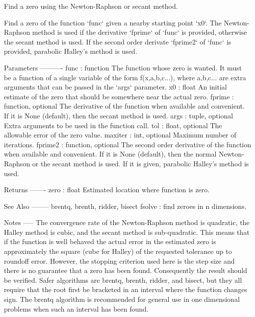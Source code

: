 \begin{DoxyVerb}Find a zero using the Newton-Raphson or secant method.

Find a zero of the function `func` given a nearby starting point `x0`.
The Newton-Raphson method is used if the derivative `fprime` of `func`
is provided, otherwise the secant method is used.  If the second order
derivate `fprime2` of `func` is provided, parabolic Halley's method
is used.

Parameters
----------
func : function
    The function whose zero is wanted. It must be a function of a
    single variable of the form f(x,a,b,c...), where a,b,c... are extra
    arguments that can be passed in the `args` parameter.
x0 : float
    An initial estimate of the zero that should be somewhere near the
    actual zero.
fprime : function, optional
    The derivative of the function when available and convenient. If it
    is None (default), then the secant method is used.
args : tuple, optional
    Extra arguments to be used in the function call.
tol : float, optional
    The allowable error of the zero value.
maxiter : int, optional
    Maximum number of iterations.
fprime2 : function, optional
    The second order derivative of the function when available and
    convenient. If it is None (default), then the normal Newton-Raphson
    or the secant method is used. If it is given, parabolic Halley's
    method is used.

Returns
-------
zero : float
    Estimated location where function is zero.

See Also
--------
brentq, brenth, ridder, bisect
fsolve : find zeroes in n dimensions.

Notes
-----
The convergence rate of the Newton-Raphson method is quadratic,
the Halley method is cubic, and the secant method is
sub-quadratic.  This means that if the function is well behaved
the actual error in the estimated zero is approximately the square
(cube for Halley) of the requested tolerance up to roundoff
error. However, the stopping criterion used here is the step size
and there is no guarantee that a zero has been found. Consequently
the result should be verified. Safer algorithms are brentq,
brenth, ridder, and bisect, but they all require that the root
first be bracketed in an interval where the function changes
sign. The brentq algorithm is recommended for general use in one
dimensional problems when such an interval has been found.\end{DoxyVerb}
 \hypertarget{namespacescipy_1_1optimize_1_1zeros_aeaa5e32ae93421ba62caeff5fa44380f}{}
